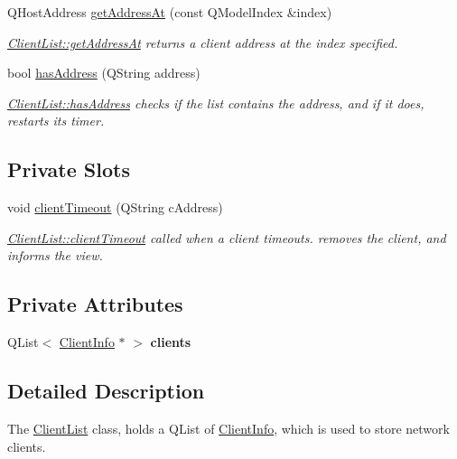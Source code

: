 \begin{DoxyCompactItemize}
Q\+Host\+Address \hyperlink{class_client_list_a78069b39dd0fa9d9af135d8e1538538a}{get\+Address\+At} (const Q\+Model\+Index \&index)
\begin{DoxyCompactList}\small\item\em \hyperlink{class_client_list_a78069b39dd0fa9d9af135d8e1538538a}{Client\+List\+::get\+Address\+At} returns a client address at the index specified. \end{DoxyCompactList}\item 
bool \hyperlink{class_client_list_a7a564d804ac940fe3364b0a5d54c03ce}{has\+Address} (Q\+String address)
\begin{DoxyCompactList}\small\item\em \hyperlink{class_client_list_a7a564d804ac940fe3364b0a5d54c03ce}{Client\+List\+::has\+Address} checks if the list contains the address, and if it does, restarts its timer. \end{DoxyCompactList}\end{DoxyCompactItemize}
\subsection*{Private Slots}
\begin{DoxyCompactItemize}
\item 
void \hyperlink{class_client_list_aac59ca6adda4d7e42c7d07e498bac7cd}{client\+Timeout} (Q\+String c\+Address)
\begin{DoxyCompactList}\small\item\em \hyperlink{class_client_list_aac59ca6adda4d7e42c7d07e498bac7cd}{Client\+List\+::client\+Timeout} called when a client timeouts. removes the client, and informs the view. \end{DoxyCompactList}\end{DoxyCompactItemize}
\subsection*{Private Attributes}
\begin{DoxyCompactItemize}
\item 
\hypertarget{class_client_list_a37fc232f71c36ccc9e36e30968f113a4}{Q\+List$<$ \hyperlink{class_client_info}{Client\+Info} $\ast$ $>$ {\bfseries clients}}\label{class_client_list_a37fc232f71c36ccc9e36e30968f113a4}

\end{DoxyCompactItemize}


\subsection{Detailed Description}
The \hyperlink{class_client_list}{Client\+List} class, holds a Q\+List of \hyperlink{class_client_info}{Client\+Info}, which is used to store network clients. 


